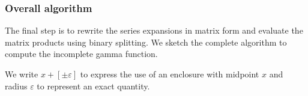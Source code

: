 \documentclass[reqno]{amsart}
\theoremstyle{definition}
\begin{document}




\subsubsection{Overall algorithm}

The final step is to rewrite the series expansions
in matrix form and evaluate the matrix products
using binary splitting.
We sketch the complete algorithm to compute the incomplete gamma function.

We write $x + [\pm \varepsilon]$ to express
the use of an enclosure with midpoint $x$ and radius $\varepsilon$
to represent an exact quantity.
\end{document}
